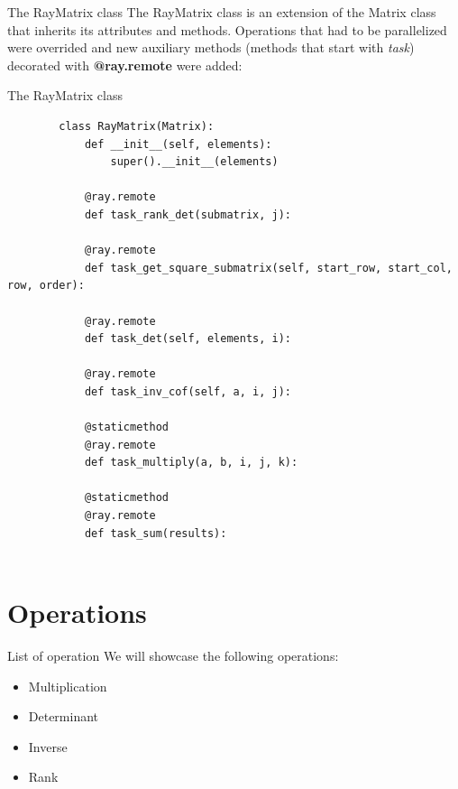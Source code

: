 \documentclass{beamer}
\begin{document}
\begin{frame}{The RayMatrix class}
    The \alert{RayMatrix} class is an extension of the Matrix class that inherits its attributes and methods. Operations that had to be parallelized were overrided and new auxiliary methods (methods that start with \textit{task\textunderscore}) decorated with \textbf{@ray.remote} were added:
\end{frame}

\begin{frame}[fragile]{The RayMatrix class}
    \begin{tiny}
        \begin{verbatim}
        class RayMatrix(Matrix):
            def __init__(self, elements):
                super().__init__(elements)
            
            @ray.remote
            def task_rank_det(submatrix, j):

            @ray.remote
            def task_get_square_submatrix(self, start_row, start_col, row, order):

            @ray.remote
            def task_det(self, elements, i):

            @ray.remote
            def task_inv_cof(self, a, i, j):

            @staticmethod
            @ray.remote
            def task_multiply(a, b, i, j, k):
            
            @staticmethod
            @ray.remote
            def task_sum(results):
        
    \end{verbatim}
    \end{tiny}
\end{frame}

\section{Operations}
\begin{frame}{List of operation}
    We will showcase the following operations:
    \begin{itemize}
        \item{Multiplication}
        \item{Determinant}
        \item{Inverse}
        \item{Rank}
    \end{itemize}
\end{frame}
\end{document}
